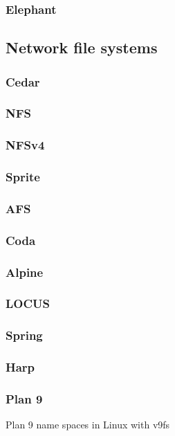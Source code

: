 \subsubsection{Elephant}
\cite{santry}

\subsection{Network file systems}
\subsubsection{Cedar}
\cite{gifford,hagmann}
\subsubsection{NFS}
\cite{sandberg,pawlowski,callaghan}
\subsubsection{NFSv4}
\subsubsection{Sprite}
\cite{baker91,nelson,welch}
\subsubsection{AFS}
\cite{howard}
\subsubsection{Coda}
\cite{kistler,satyanarayanan}
\subsubsection{Alpine}
\cite{brown}
\subsubsection{LOCUS}
\cite{walker}
\subsubsection{Spring}
\cite{khalidi}
\subsubsection{Harp}
\cite{liskov}
\subsubsection{Plan 9}
Plan 9 \cite{pike90} name spaces \cite{pike92} in Linux with v9fs \cite{hensbergen}
